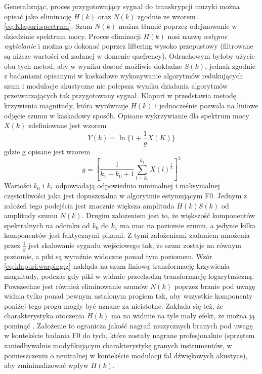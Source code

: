 \documentclass[12pt,a4paper,twoside]{mwart}
\begin{document}
Generalizując, proces przygotowujący sygnał do transkrypcji muzyki można opisać jako eliminację $H(k)$ oraz $N(k)$ zgodnie ze wzorem \ref{eq:Klapuri:spectrum}. Szum $N(k)$ można tłumić poprzez odejmowanie w dziedzinie spektrum mocy. Proces eliminacji $H(k)$ nosi nazwę \textit{wstępne wybielanie} i można go dokonać poprzez liftering wysoko przepustowy (filtrowane są niższe wartości od zadanej w domenie quefrency). Odruchowym byłoby użycie obu tych metod, aby w wyniku dostać możliwie dokładne $S(k)$, jednak zgodnie z badaniami opisanymi w \cite[85-86]{Transcription:Hermansky:RecognitionInNoise} kaskadowe wykonywanie algorytmów redukujących szum i modulacje akustyczne nie polepsza wyniku działania algorytmów przetwarzających tak przygotowany sygnał. Klapuri w \cite[806]{Transcription:Klapuri:MultipleFundamentalFrequencyEstimation} przedstawia metodę krzywienia magnitudy, która wyrównuje $H(k)$ i jednocześnie pozwala na liniowe odjęcie szumu w kaskadowy sposób. Opisane wykrzywianie dla spektrum mocy $X(k)$ zdefiniowane jest wzorem
\begin{equation}\label{eq:klapuri:warping}
  Y(k) = \ln\{ 1 + \frac{1}{g}X(K)\}
\end{equation}
gdzie g opisane jest wzorem
\begin{equation}\label{eq:klapuri:warping:g}
  g = [ \frac{1}{k_1 - k_0 + 1} \sum_{l=k_0}^{k_1}X(l)^{\frac{1}{3}}]^3
\end{equation}
Wartości $k_0$ i $k_1$ odpowiadają odpowiednio minimalnej i maksymalnej częstotliwości jaka jest dopuszczalna w algorytmie estymującym F0. Jednym z założeń tego podejścia jest znacznie większa amplituda $H(k)S(k)$ od amplitudy szumu $N(k)$. Drugim założeniem jest to, że większość komponentów spektralnych na odcinku od $k_0$ do $k_1$  ma moc na poziomie szumu, a jedynie kilka komponentów jest faktycznymi pikami. Z tymi założeniami zadaniem mnożenia przez $\frac{1}{g}$ jest skalowanie sygnału wejściowego tak, że szum zostaje na równym poziomie, a piki są wyraźnie widoczne ponad tym poziomem. Wzór \ref{eq:klapuri:warping:g} nakłąda na szum liniową transformację krzywienia magnitudy, podczas gdy piki w widmie przechodzą transformację logarytmiczną. Powszechne jest również eliminowanie szumów $N(k)$ poprzez branie pod uwagę widma tylko ponad pewnym ustalonym progiem tak, aby wszystkie komponenty poniżej tego progu mogły być uznane za nieistotne. Zakłada się też, że charakterystyka otoczenia $H(k)$ ma na widmie na tyle mały efekt, że można ją pominąć \cite{Transcription:Pertus:Inharmonicity}. Założenie to ogranicza jakość nagrań muzycznych branych pod uwagę w kontekście badania F0 do tych, które zostały nagrane profesjonalnie (sprzętem zaniedbywalnie modyfikującym charakterystykę granych instrumentów, w pomieszczeniu o neutralnej w kontekście modulacji fal dźwiękowych akustyce), aby zminimalizować wpływ $H(k)$.
\end{document}
